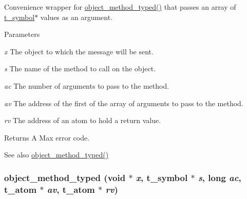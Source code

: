 Convenience wrapper for \hyperlink{group__obj_ga443dee482af22e0fe83e68955d367226}{object\_\-method\_\-typed()} that passes an array of \hyperlink{structt__symbol}{t\_\-symbol}$\ast$ values as an argument. 
\begin{DoxyParams}{Parameters}
\item[{\em x}]The object to which the message will be sent. \item[{\em s}]The name of the method to call on the object. \item[{\em ac}]The number of arguments to pass to the method. \item[{\em av}]The address of the first of the array of arguments to pass to the method. \item[{\em rv}]The address of an atom to hold a return value.\end{DoxyParams}
\begin{DoxyReturn}{Returns}
A Max error code. 
\end{DoxyReturn}
\begin{DoxySeeAlso}{See also}
\hyperlink{group__obj_ga443dee482af22e0fe83e68955d367226}{object\_\-method\_\-typed()} 
\end{DoxySeeAlso}
\hypertarget{group__obj_ga443dee482af22e0fe83e68955d367226}{
\subsubsection[{object\_\-method\_\-typed}]{ object\_\-method\_\-typed (void $\ast$ {\em x}, \/  {\bf t\_\-symbol} $\ast$ {\em s}, \/  long {\em ac}, \/  {\bf t\_\-atom} $\ast$ {\em av}, \/  {\bf t\_\-atom} $\ast$ {\em rv})}}
\label{group__obj_ga443dee482af22e0fe83e68955d367226}


